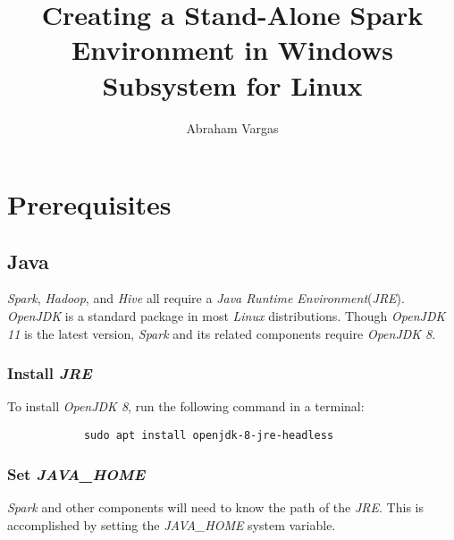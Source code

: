 \documentclass{article}
\begin{document}
    \title{Creating a Stand-Alone Spark Environment in Windows Subsystem for Linux}
    \author{Abraham Vargas}
    \maketitle

    \newpage
    \tableofcontents
    \newpage

    \section{Prerequisites}

        \subsection{Java}
        \emph{Spark}, \emph{Hadoop}, and \emph{Hive} all require a \emph{Java Runtime Environment}(\emph{JRE}).
        \emph{OpenJDK} is a standard package in most \emph{Linux} distributions. Though \emph{OpenJDK 11}
        is the latest version, \emph{Spark} and its related components require \emph{OpenJDK 8}.
        
            \subsubsection{Install \emph{JRE}}
            To install \emph{OpenJDK 8}, run the following command in a terminal:
            \begin{verbatim}
            sudo apt install openjdk-8-jre-headless            
            \end{verbatim}

            \subsubsection{Set \emph{JAVA\_HOME}}
            \emph{Spark} and other components will need to know the path of the
            \emph{JRE}. This is accomplished by setting the \emph{JAVA\_HOME}
            system variable.
\end{document}

